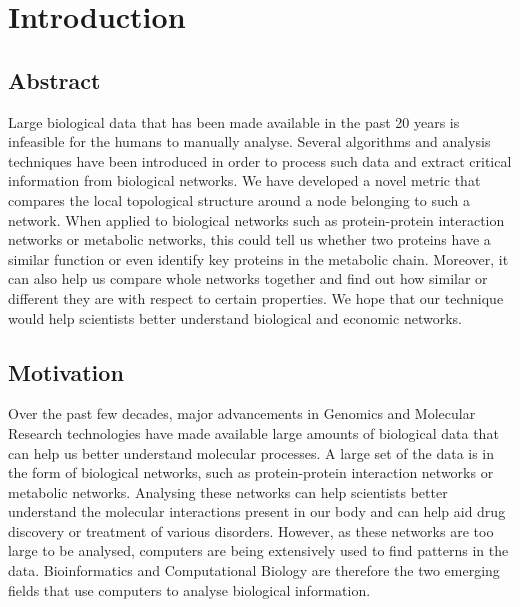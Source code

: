 \chapter{Introduction}

\section{Abstract}

Large biological data that has been made available in the past 20 years is
infeasible for the humans to manually analyse. Several algorithms and analysis
techniques have been introduced in order to process such data and extract
critical information from biological networks. We have developed a novel metric
that compares the local topological structure around a node belonging to such a
network. When applied to biological networks such as protein-protein interaction
networks or metabolic networks, this could tell us whether two proteins have a
similar function or even identify key proteins in the metabolic chain. Moreover,
it can also help us compare whole networks together and find out how similar or
different they are with respect to certain properties. We hope that our
technique would help scientists better understand biological and
economic networks.

\section{Motivation}

Over the past few decades, major advancements in Genomics and Molecular
Research technologies have made available large amounts of biological data that
can help us better understand molecular processes. A large set of the data is
in the form of biological networks, such as protein-protein interaction
networks or metabolic networks. Analysing these networks can help scientists
better understand the molecular interactions present in our body and can help
aid drug discovery or treatment of various disorders. However, as these
networks are too large to be analysed, computers are being extensively used to
find patterns in the data. Bioinformatics and Computational Biology are
therefore the two emerging fields that use computers to analyse biological
information.

